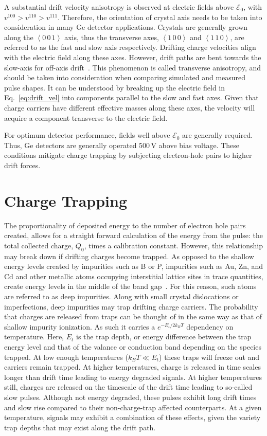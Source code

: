 A substantial drift velocity anisotropy is observed at electric fields above $\mathcal{E}_0$, with $v^{100} > v^{110} > v^{111}$. Therefore, the orientation of crystal axis needs to be taken into consideration in many Ge detector applications. Crystals are generally grown along the $\left<0\,0\,1\right>$ axis, thus the transverse axes, $\left<1\,0\,0\right>$ and $\left<1\,1\,0\right>$, are referred to as the fast and slow axis respectively. Drifting charge velocities align with the electric field along these axes. However, drift paths are bent towards the slow-axis for off-axis drift~\cite{Mihailescu2000}. This phenomenon is called transverse anisotropy, and should be taken into consideration when comparing simulated and measured pulse shapes. It can be understood by breaking up the electric field in Eq.~\ref{eq:drift_vel} into components parallel to the slow and fast axes. Given that charge carriers have different effective masses along these axes, the velocity will acquire a component transverse to the electric field. 

For optimum detector performance, fields well above $\mathcal{E}_0$ are generally required. Thus, Ge detectors are generally operated 500\,V above bias voltage. These conditions mitigate charge trapping by subjecting electron-hole pairs to higher drift forces.

\section{Charge Trapping}\label{sec:charge_trapping}
The proportionality of deposited energy to the number of electron hole pairs created, allows for a straight forward calculation of the energy from the pulse: the total collected charge, $Q_0$, times a calibration constant. However, this relationship may break down if drifting charges become trapped. As opposed to the shallow energy levels created by impurities such as B or P, impurities such as Au, Zn, and Cd and other metallic atoms occupying interstitial lattice sites in trace quantities, create energy levels in the middle of the band gap~\cite{deep_impurities}. For this reason, such atoms are referred to as deep impurities. Along with small crystal dislocations or imperfections, deep impurities may trap drifting charge carriers. The probability that charges are released from traps can be thought of in the same way as that of shallow impurity ionization. As such it carries a $e^{-E_t/2k_BT}$ dependency on temperature. Here, $E_t$ is the trap depth, or energy difference between the trap energy level and that of the valance or conduction band depending on the species trapped. At low enough temperatures ($k_BT \ll E_t$) these traps will freeze out and carriers remain trapped. At higher temperatures, charge is released in time scales longer than drift time leading to energy degraded signals. At higher temperatures still, charges are released on the timescale of the drift time leading to so-called slow pulses. Although not energy degraded, these pulses exhibit long drift times and slow rise compared to their non-charge-trap affected counterparts. At a given temperature, signals may exhibit a combination of these effects, given the variety trap depths that may exist along the drift path. 

